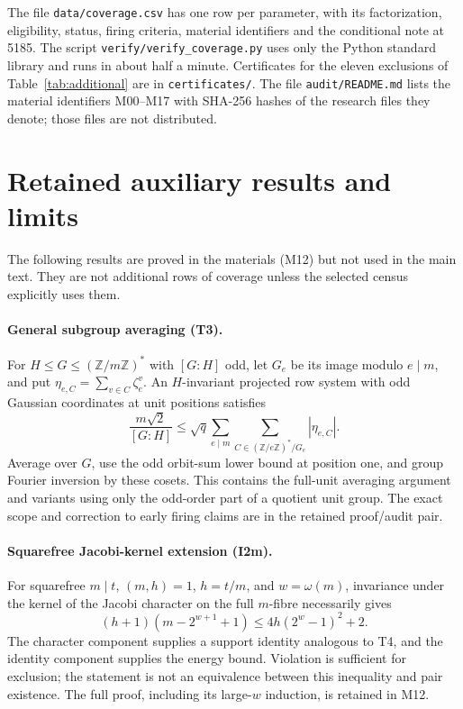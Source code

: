 \documentclass[11pt]{article}
\theoremstyle{definition}
\theoremstyle{remark}
\begin{document}
The file \texttt{data/coverage.csv} has one row per parameter, with its
factorization, eligibility, status, firing criteria, material identifiers
and the conditional note at 5185. The script \texttt{verify/verify\_coverage.py}
uses only the Python standard library and runs in about half a minute.
Certificates for the eleven exclusions of Table~\ref{tab:additional} are in
\texttt{certificates/}. The file \texttt{audit/README.md} lists the material
identifiers M00--M17 with SHA-256 hashes of the research files they denote;
those files are not distributed.

\appendix
\section{Retained auxiliary results and limits}\label{app:auxiliary}
The following results are proved in the materials (M12) but not used in
the main text. They are not additional rows of coverage unless the selected
census explicitly uses them.

\paragraph{General subgroup averaging (T3).}
For $H\le G\le(\mathbb Z/m\mathbb Z)^*$ with $[G:H]$ odd, let $G_e$
be its image modulo $e\mid m$, and put
$\eta_{e,C}=\sum_{v\in C}\zeta_e^v$. An $H$-invariant projected row
system with odd Gaussian coordinates at unit positions satisfies
\[
 \frac{m\sqrt2}{[G:H]}\le\sqrt q
 \sum_{e\mid m}\sum_{C\in(\mathbb Z/e\mathbb Z)^*/G_e}|\eta_{e,C}|.
\]
Average over $G$, use the odd orbit-sum lower bound at position one,
and group Fourier inversion by these cosets. This contains the full-unit
averaging argument and variants using only the odd-order part of a quotient
unit group. The exact scope and correction to early firing claims are in
the retained proof/audit pair.

\paragraph{Squarefree Jacobi-kernel extension (I2m).}
For squarefree $m\mid t$, $(m,h)=1$, $h=t/m$, and $w=\omega(m)$,
invariance under the kernel of the Jacobi character on the full $m$-fibre
necessarily gives
\[
 (h+1)(m-2^{w+1}+1)\le4h(2^w-1)^2+2.
\]
The character component supplies a support identity analogous to T4, and
the identity component supplies the energy bound. Violation is sufficient
for exclusion; the statement is not an equivalence between this inequality
and pair existence. The full proof, including its large-$w$ induction, is
retained in M12.
\end{document}
